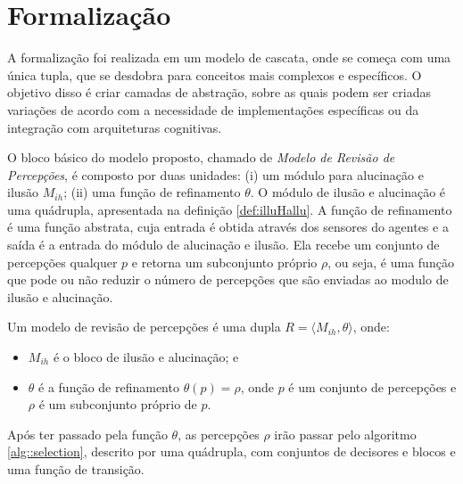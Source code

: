 \section{Formalização}

A formalização foi realizada em um modelo de cascata, onde se começa com uma única tupla, que se desdobra para conceitos mais complexos e específicos. O objetivo disso é criar camadas de abstração, sobre as quais podem ser criadas variações de acordo com a necessidade de implementações específicas ou da integração com arquiteturas cognitivas.

 O bloco básico do modelo proposto, chamado de \emph{Modelo de Revisão de Percepções}, é composto por duas unidades: (i) um módulo para alucinação e ilusão $M_{ih}$; (ii) uma função de refinamento $\theta$. O módulo de ilusão e alucinação é uma quádrupla, apresentada na definição \ref{def:illuHallu}. A função de refinamento é uma função abstrata, cuja entrada é obtida através dos sensores do agentes e a saída é a entrada do módulo de alucinação e ilusão. Ela recebe um conjunto de percepções qualquer $p$ e retorna um subconjunto próprio $\rho$, ou seja, é uma função que pode ou não reduzir o número de percepções que são enviadas ao modulo de ilusão e alucinação.

\begin{definition}{}
    Um modelo de revisão de percepções é uma dupla $R = \langle M_{ih}, \theta \rangle$, onde:
    
    \begin{itemize}
        \item $M_{ih}$ é o bloco de ilusão e alucinação; e
        \item $\theta$ é a função de refinamento $\theta(p) = \rho$, onde $p$ é um conjunto de percepções e $\rho$ é um subconjunto próprio de $p$.
    \end{itemize}{}
    
\end{definition}

Após ter passado pela função $\theta$, as percepções $\rho$ irão passar pelo algoritmo \ref{alg::selection}, descrito por uma quádrupla, com conjuntos de decisores e blocos e uma função de transição.

